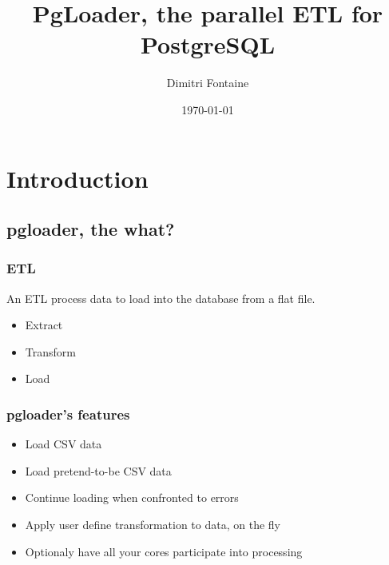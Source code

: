 \documentclass{beamer}
\title{PgLoader, the parallel ETL for PostgreSQL}
\author{Dimitri Fontaine}
\date{\today}
\begin{document}
\frame{\titlepage}

\section[Outline]{}
\frame{\tableofcontents}

\section{Introduction}
\subsection{pgloader, the what?}

\frame
{
  \frametitle{ETL}

  \begin{definition}
    An \alert{ETL} process data to load into the database from a flat
    file.
  \end{definition}

  \begin{itemize}
  \item<1-> Extract
  \item<2-> Transform
  \item<3-> Load
  \end{itemize}
}

\frame
{
  \frametitle{pgloader's features}

  \begin{itemize}
  \item<1-> Load CSV data
  \item<2-> Load pretend-to-be CSV data
  \item<3-> Continue loading when confronted to errors
  \item<4-> Apply user define transformation to data, on the fly
  \item<5-> Optionaly have all your cores participate into processing
  \end{itemize}
}
\end{document}

